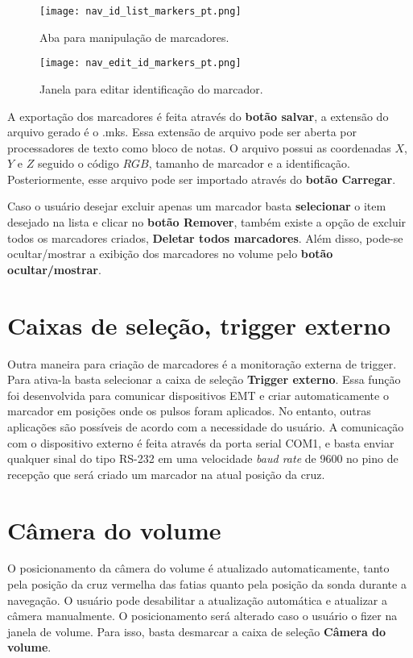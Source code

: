 \begin{figure}[!htb]
\centering
\texttt{[image: nav\_id\_list\_markers\_pt.png]}
\caption{Aba para manipulação de marcadores.}
\label{fig:nav_id_list_markers}
\end{figure} 

\begin{figure}[!htb]
\centering
\texttt{[image: nav\_edit\_id\_markers\_pt.png]}
\caption{Janela para editar identificação do marcador.}
\label{fig:nav_edit_id_markers}
\end{figure} 

A exportação dos marcadores é feita através do \textbf{botão salvar}, a extensão do arquivo gerado é o .mks. Essa extensão de arquivo pode ser aberta por processadores de texto como bloco de notas. O arquivo possui as coordenadas $X$, $Y$ e $Z$ seguido o código $RGB$, tamanho de marcador e a identificação. Posteriormente, esse arquivo pode ser importado através do \textbf{botão Carregar}.

Caso o usuário desejar excluir apenas um marcador basta \textbf{selecionar} o item desejado na lista e clicar no \textbf{botão Remover}, também existe a opção de excluir todos os marcadores criados, \textbf{Deletar todos marcadores}. Além disso, pode-se ocultar/mostrar a exibição dos marcadores no volume pelo \textbf{botão ocultar/mostrar}.

\section{Caixas de seleção, trigger externo}

Outra maneira para criação de marcadores é a monitoração externa de trigger. Para ativa-la basta selecionar a caixa de seleção \textbf{Trigger externo}. Essa função foi desenvolvida para comunicar dispositivos EMT e criar automaticamente o marcador em posições onde os pulsos foram aplicados. No entanto, outras aplicações são possíveis de acordo com a necessidade do usuário.
A comunicação com o dispositivo externo é feita através da porta serial COM1, e basta enviar qualquer sinal do tipo RS-232 em uma velocidade \textit{baud rate} de 9600 no pino de recepção que será criado um marcador na atual posição da cruz.

\section{Câmera do volume}

O posicionamento da câmera do volume é atualizado automaticamente, tanto pela posição da cruz vermelha das fatias quanto pela posição da sonda durante a navegação. O usuário pode desabilitar a atualização automática e atualizar a câmera manualmente. O posicionamento será alterado caso o usuário o fizer na janela de volume.  Para isso, basta desmarcar a caixa de seleção \textbf{Câmera do volume}.

